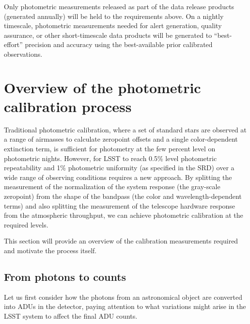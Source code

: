 \documentclass[12pt,preprint]{aastex}
\begin{document}
Only photometric measurements released as part of the data release
products (generated annually) will be held to the requirements
above. On a nightly timescale, photometric measurements needed for
alert generation, quality assurance, or other short-timescale data
products will be generated to ``best-effort'' precision and accuracy
using the best-available prior calibrated observations.

\section{Overview of the photometric calibration process}

Traditional photometric calibration, where a set of standard stars are
observed at a range of airmasses to calculate zeropoint offsets and a
single color-dependent extinction term, is sufficient for photometry
at the few percent level on photometric nights. However, for LSST to
reach 0.5\% level photometric repeatability and 1\% photometric
uniformity (as specified in the SRD) over a wide range
of observing conditions requires a new approach. By splitting the
measurement of the normalization of the system response (the
gray-scale zeropoint) from the shape of the bandpass (the color and
wavelength-dependent terms) and also splitting the measurement
of the telescope hardware response from the atmospheric throughput, we
can achieve photometric calibration at the required levels. 

This section will provide an overview of the calibration measurements
required and motivate the process itself. 

\subsection{From photons to counts}

Let us first consider how the photons from an astronomical object are
converted into ADUs in the detector, paying attention to
what variations might arise in the LSST system to affect the final ADU
counts.
\end{document}
